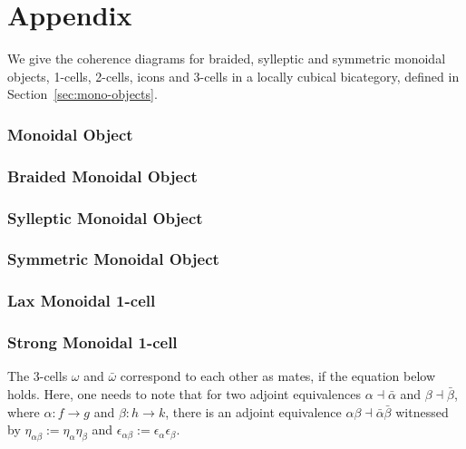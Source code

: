 \section{Appendix}
\label{ap:coherence}

We give the coherence diagrams for braided, sylleptic and symmetric monoidal objects, 1-cells, 2-cells, icons and 3-cells in a locally cubical bicategory, defined in Section~\ref{sec:mono-objects}.

\subsubsection*{Monoidal Object}


%
%

\subsubsection*{Braided Monoidal Object}

\subsubsection*{Sylleptic Monoidal Object}

\subsubsection*{Symmetric Monoidal Object}

\subsubsection*{Lax Monoidal 1-cell}

\subsubsection*{Strong Monoidal 1-cell}

%

The 3-cells $\omega$ and $\bar{\omega}$ correspond to each other as mates, if the equation below holds. Here, one needs to note that for two adjoint equivalences $\alpha \dashv \bar{\alpha}$ and $\beta \dashv \bar{\beta}$, where $\alpha: f \rightarrow g$ and $\beta: h \rightarrow k$, there is an adjoint equivalence $\alpha \beta \dashv \bar{\alpha}\bar{\beta}$ witnessed by $\eta_{\alpha \beta} := \eta_{\alpha} \eta_{\beta}$ and $\epsilon_{\alpha \beta} :=  \epsilon_{\alpha} \epsilon_{\beta}$.  %

